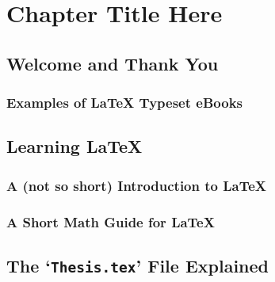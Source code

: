 
\chapter{Chapter Title Here} %
\label{Chapter1}

\section{Welcome and Thank You}

\subsection{Examples of \LaTeX{} Typeset eBooks}

\section{Learning \LaTeX{}}

\subsection{A (not so short) Introduction to \LaTeX{}}

\subsection{A Short Math Guide for \LaTeX{}}
\section{The `\texttt{Thesis.tex}' File Explained}

